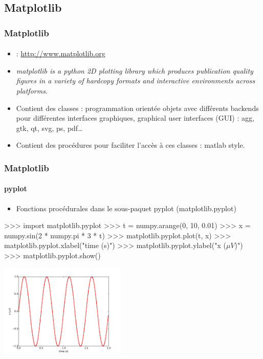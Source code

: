 \subsection{Matplotlib}
\begin{frame}[fragile]
\frametitle{Matplotlib}
\framesubtitle{}
\begin{itemize}
 \item {} : \url{http://www.matplotlib.org}
 \item \emph{matplotlib is a python 2D plotting library which produces publication quality figures in a variety of hardcopy formats and interactive environments across platforms. }
 \item Contient des classes : programmation orientée objets avec différents backends pour différentes interfaces graphiques, graphical user interfaces (GUI) : agg, gtk, qt, svg, ps, pdf\dots
 \item Contient des procédures pour faciliter l'accès à ces classes : matlab style. 
\end{itemize}
\end{frame}
\begin{frame}[fragile]
\frametitle{Matplotlib}
\framesubtitle{pyplot}
\begin{itemize}
 \item Fonctions procédurales dans le sous-paquet pyplot (matplotlib.pyplot)
\end{itemize}
\begin{pythonConsole}
>>> import matplotlib.pyplot
>>> t = numpy.arange(0, 10, 0.01)
>>> x = numpy.sin(2 * numpy.pi * 3 * t)
>>> matplotlib.pyplot.plot(t, x)
>>> matplotlib.pyplot.xlabel("time (s)")
>>> matplotlib.pyplot.ylabel("x ($\mu V$)")
>>> matplotlib.pyplot.show()
\end{pythonConsole}
\begin{center}
 \includegraphics[width=6cm]{./fig/matplotlibSinus.pdf}
\end{center}
\end{frame}
